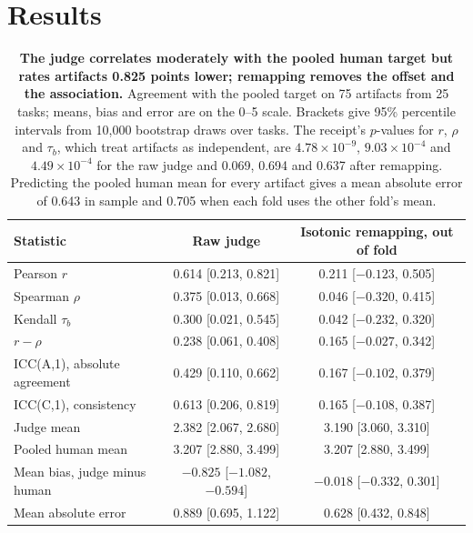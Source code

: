 \section{Results}
\label{sec:results}

\begin{table}[t]
\centering
\small
\begin{tabular}{lcc}
\toprule
Statistic & Raw judge & Isotonic remapping, out of fold \\
\midrule
Pearson $r$ & 0.614 [0.213, 0.821] & 0.211 [$-0.123$, 0.505] \\
Spearman $\rho$ & 0.375 [0.013, 0.668] & 0.046 [$-0.320$, 0.415] \\
Kendall $\tau_b$ & 0.300 [0.021, 0.545] & 0.042 [$-0.232$, 0.320] \\
$r-\rho$ & 0.238 [0.061, 0.408] & 0.165 [$-0.027$, 0.342] \\
ICC(A,1), absolute agreement & 0.429 [0.110, 0.662] & 0.167 [$-0.102$, 0.379] \\
ICC(C,1), consistency & 0.613 [0.206, 0.819] & 0.165 [$-0.108$, 0.387] \\
Judge mean & 2.382 [2.067, 2.680] & 3.190 [3.060, 3.310] \\
Pooled human mean & 3.207 [2.880, 3.499] & 3.207 [2.880, 3.499] \\
Mean bias, judge minus human & $-0.825$ [$-1.082$, $-0.594$] & $-0.018$ [$-0.332$, 0.301] \\
Mean absolute error & 0.889 [0.695, 1.122] & 0.628 [0.432, 0.848] \\
\bottomrule
\end{tabular}
\caption{\textbf{The judge correlates moderately with the pooled human target but rates artifacts 0.825 points lower; remapping removes the offset and the association.} Agreement with the pooled target on 75 artifacts from 25 tasks; means, bias and error are on the 0--5 scale.
Brackets give 95\% percentile intervals from 10,000 bootstrap draws over tasks.
The receipt's $p$-values for $r$, $\rho$ and $\tau_b$, which treat artifacts as independent, are $4.78\times10^{-9}$, $9.03\times10^{-4}$ and $4.49\times10^{-4}$ for the raw judge and 0.069, 0.694 and 0.637 after remapping.
Predicting the pooled human mean for every artifact gives a mean absolute error of 0.643 in sample and 0.705 when each fold uses the other fold's mean.}
\label{tab:pooled}
\end{table}

